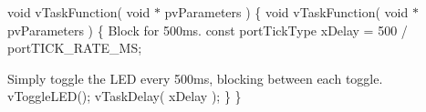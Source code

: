 void v\-Task\-Function( void $\ast$ pv\-Parameters ) \{ void v\-Task\-Function( void $\ast$ pv\-Parameters ) \{ Block for 500ms. const port\-Tick\-Type x\-Delay = 500 / port\-T\-I\-C\-K\-\_\-\-R\-A\-T\-E\-\_\-\-M\-S; \begin{DoxyVerb}    for( ;; )
    {
\end{DoxyVerb}
 Simply toggle the L\-E\-D every 500ms, blocking between each toggle. v\-Toggle\-L\-E\-D(); v\-Task\-Delay( x\-Delay ); \} \} 
